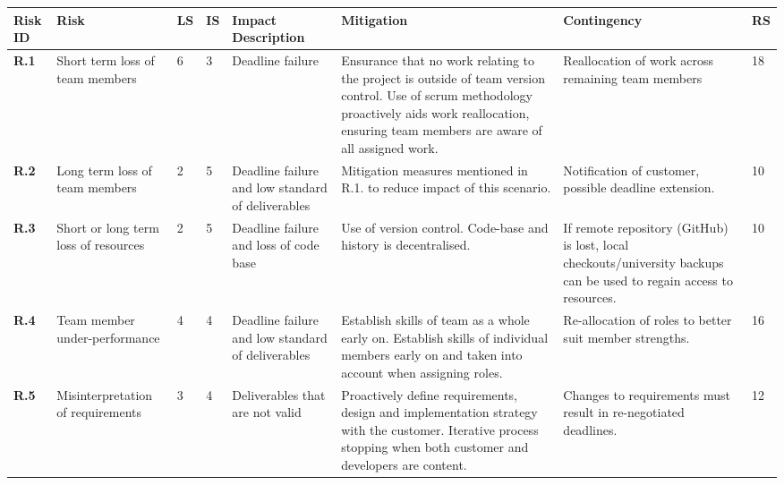 \begin{longtable}[H]{| p{0.7cm} | p{2cm} | p{0.3cm} | p{0.3cm} | p{2.4cm} | p{4.1cm} | p{3cm} | p{0.4cm} |}
  \hline
  \cellcolor{titleColor}\textbf{Risk ID} &
  \cellcolor{titleColor}\textbf{Risk} &
  \cellcolor{titleColor}\textbf{LS} &
  \cellcolor{titleColor}\textbf{IS} &
  \cellcolor{titleColor}\textbf{Impact Description} &
  \cellcolor{titleColor}\textbf{Mitigation} &
  \cellcolor{titleColor}\textbf{Contingency} &
  \cellcolor{titleColor}\textbf{RS}\\

  \hline \textbf{R.1}
  & Short term loss of team members
  & 6
  & 3
  & Deadline failure
  & Ensurance that no work relating to the project is outside of team
  version control. Use of scrum methodology proactively aids work
  reallocation, ensuring team members are aware of all assigned work.
  & Reallocation of work across remaining team members
  & 18 \\

  \hline \textbf{R.2}
  & Long term loss of team members
  & 2
  & 5
  & Deadline failure and low standard of deliverables
  & Mitigation measures mentioned in R.1. to reduce impact of this
  scenario.
  & Notification of customer, possible deadline extension.
  & 10 \\

  \hline \textbf{R.3}
  & Short or long term loss of resources
  & 2
  & 5
  & Deadline failure and loss of code base
  & Use of version control. Code-base and history is decentralised.
  & If remote repository (GitHub) is lost, local checkouts/university
  backups can be used to regain access to resources.
  & 10 \\

  \hline \textbf{R.4}
  & Team member under-performance
  & 4
  & 4
  & Deadline failure and low standard of deliverables
  & Establish skills of team as a whole early on. Establish skills of
  individual members early on and taken into account when assigning
  roles.
  & Re-allocation of roles to better suit member strengths.
  & 16 \\

  \hline \textbf{R.5}
  & Misinterpreta\-tion of requirements
  & 3
  & 4
  & Deliverables that are not valid
  & Proactively define requirements, design and implementation
  strategy with the customer. Iterative process stopping when both
  customer and developers are content.
  & Changes to requirements must result in re-negotiated deadlines.
  & 12 \\


\end{longtable}
